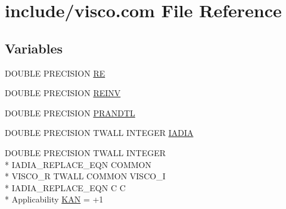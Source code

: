 \hypertarget{visco_8com}{\section{include/visco.com File Reference}
\label{visco_8com}
}
\subsection*{Variables}
\begin{DoxyCompactItemize}
\item 
D\-O\-U\-B\-L\-E P\-R\-E\-C\-I\-S\-I\-O\-N \hyperlink{visco_8com_acee3bf3b2f2eee0ca24fa7fcea80bf5e}{R\-E}
\item 
D\-O\-U\-B\-L\-E P\-R\-E\-C\-I\-S\-I\-O\-N \hyperlink{visco_8com_a572d2eabf094e0bf11921a66d45a36b2}{R\-E\-I\-N\-V}
\item 
D\-O\-U\-B\-L\-E P\-R\-E\-C\-I\-S\-I\-O\-N \hyperlink{visco_8com_a230c5bd89486988c1c250f8d67ed6266}{P\-R\-A\-N\-D\-T\-L}
\item 
D\-O\-U\-B\-L\-E P\-R\-E\-C\-I\-S\-I\-O\-N T\-W\-A\-L\-L I\-N\-T\-E\-G\-E\-R \hyperlink{visco_8com_aac6f06569f9c01d0b51c03f107eb2693}{I\-A\-D\-I\-A}
\item 
D\-O\-U\-B\-L\-E P\-R\-E\-C\-I\-S\-I\-O\-N T\-W\-A\-L\-L I\-N\-T\-E\-G\-E\-R \\*
I\-A\-D\-I\-A\-\_\-\-R\-E\-P\-L\-A\-C\-E\-\_\-\-E\-Q\-N C\-O\-M\-M\-O\-N \\*
V\-I\-S\-C\-O\-\_\-\-R T\-W\-A\-L\-L C\-O\-M\-M\-O\-N V\-I\-S\-C\-O\-\_\-\-I \\*
I\-A\-D\-I\-A\-\_\-\-R\-E\-P\-L\-A\-C\-E\-\_\-\-E\-Q\-N C C \\*
Applicability \hyperlink{visco_8com_a5f14ddc0c5ad4e7f0d7ed332eeafbbcb}{K\-A\-N} = +1
\end{DoxyCompactItemize}


